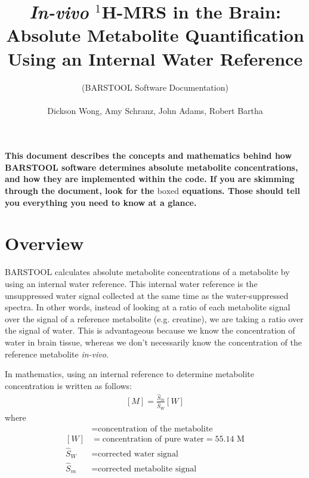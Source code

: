 \documentclass{article}
\begin{document}
\title{\textbf{\textit{In-vivo} $^1$H-MRS in the Brain:} \\ Absolute Metabolite Quantification Using an Internal Water Reference}
\author{(BARSTOOL Software Documentation) \\ \\ Dickson Wong, Amy Schranz, John Adams, Robert Bartha}

\maketitle

\bigskip
\textbf{This document describes the concepts and mathematics behind how BARSTOOL software determines absolute metabolite concentrations, and how they are implemented within the code. If you are skimming through the document, look for the $\boxed{\text{boxed}}$ equations. Those should tell you everything you need to know at a glance.}
\bigskip

\tableofcontents

\newpage
\section{Overview}
BARSTOOL calculates absolute metabolite concentrations of a metabolite by using an internal water reference. This internal water reference is the unsuppressed water signal collected at the same time as the water-suppressed spectra. In other words, instead of looking at a ratio of each metabolite signal over the signal of a reference metabolite (e.g. creatine), we are taking a ratio over the signal of water. This is advantageous because we know the concentration of water in brain tissue, whereas we don't necessarily know the concentration of the reference metabolite \textit{in-vivo}. 

In mathematics, using an internal reference to determine metabolite concentration is written as follows:
\begin{align}
	\boxed{[M] = \frac{\hat{S}_m}{\hat{S}_W}[W]}
	\label{eq:basic_eq}
\end{align}
where
\begin{align*}
	[M] &= \text{concentration of the metabolite} \\
	[W] &= \text{concentration of pure water} = 55.14 \text{ M} \\
	\hat{S}_W &= \text{corrected water signal} \\
	\hat{S}_m &= \text{corrected metabolite signal}
\end{align*}
\end{document}
